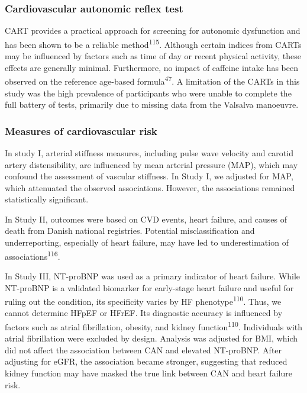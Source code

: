 \documentclass[
  a4paper,
  headsepline=true,
  open=any]{scrbook}
\begin{document}
\hypertarget{cardiovascular-autonomic-reflex-test}{%
\subsubsection{Cardiovascular autonomic reflex
test}\label{cardiovascular-autonomic-reflex-test}}

CART provides a practical approach for screening for autonomic
dysfunction and has been shown to be a reliable
method\textsuperscript{115}. Although certain indices from CARTs may be
influenced by factors such as time of day or recent physical activity,
these effects are generally minimal. Furthermore, no impact of caffeine
intake has been observed on the reference age-based
formula\textsuperscript{47}. A limitation of the CARTs in this study was
the high prevalence of participants who were unable to complete the full
battery of tests, primarily due to missing data from the Valsalva
manoeuvre.

\hypertarget{measures-of-cardiovascular-risk}{%
\subsubsection{Measures of cardiovascular
risk}\label{measures-of-cardiovascular-risk}}

In study I, arterial stiffness measures, including pulse wave velocity
and carotid artery distensibility, are influenced by mean arterial
pressure (MAP), which may confound the assessment of vascular stiffness.
In Study I, we adjusted for MAP, which attenuated the observed
associations. However, the associations remained statistically
significant.

In Study II, outcomes were based on CVD events, heart failure, and
causes of death from Danish national registries. Potential
misclassification and underreporting, especially of heart failure, may
have led to underestimation of associations\textsuperscript{116}.

In Study III, NT-proBNP was used as a primary indicator of heart
failure. While NT-proBNP is a validated biomarker for early-stage heart
failure and useful for ruling out the condition, its specificity varies
by HF phenotype\textsuperscript{110}. Thus, we cannot determine HFpEF or
HFrEF. Its diagnostic accuracy is influenced by factors such as atrial
fibrillation, obesity, and kidney function\textsuperscript{110}.
Individuals with atrial fibrillation were excluded by design. Analysis
was adjusted for BMI, which did not affect the association between CAN
and elevated NT-proBNP. After adjusting for eGFR, the association became
stronger, suggesting that reduced kidney function may have masked the
true link between CAN and heart failure risk.
\end{document}
